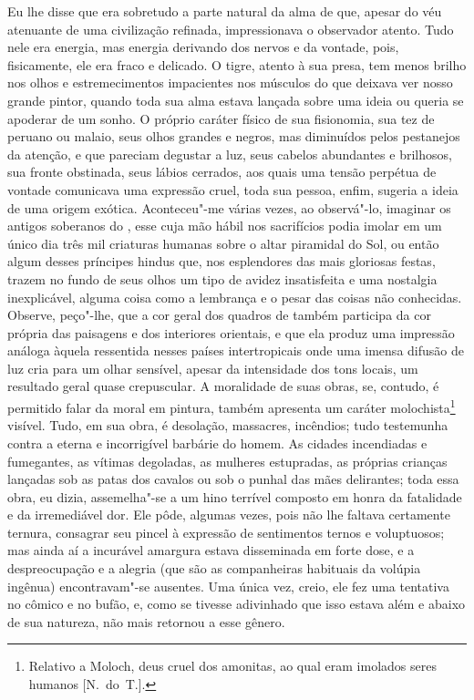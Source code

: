 Eu lhe disse que era sobretudo a parte natural da alma de  que,
apesar do véu atenuante de uma civilização refinada, impressionava o
observador atento. Tudo nele era energia, mas energia derivando dos
nervos e da vontade, pois, fisicamente, ele era fraco e delicado. O
tigre, atento à sua presa, tem menos brilho nos olhos e estremecimentos
impacientes nos músculos do que deixava ver nosso grande pintor, quando
toda sua alma estava lançada sobre uma ideia ou queria se apoderar de
um sonho. O próprio caráter físico de sua fisionomia, sua tez de
peruano ou malaio, seus olhos grandes e negros, mas diminuídos pelos
pestanejos da atenção, e que pareciam degustar a luz, seus cabelos
abundantes e brilhosos, sua fronte obstinada, seus lábios cerrados, aos
quais uma tensão perpétua de vontade comunicava uma expressão cruel,
toda sua pessoa, enfim, sugeria a ideia de uma origem exótica.
Aconteceu"-me várias vezes, ao observá"-lo, imaginar os antigos soberanos
do , esse  cuja mão hábil nos sacrifícios podia imolar
em um único dia três mil criaturas humanas sobre o altar piramidal do
Sol, ou então algum desses príncipes hindus que, nos esplendores das
mais gloriosas festas, trazem no fundo de seus olhos um tipo de avidez
insatisfeita e uma nostalgia inexplicável, alguma coisa como a
lembrança e o pesar das coisas não conhecidas. Observe, peço"-lhe, que a
cor geral dos quadros de  também participa da cor própria das
paisagens e dos interiores orientais, e que ela produz uma impressão
análoga àquela ressentida nesses países intertropicais onde uma imensa
difusão de luz cria para um olhar sensível, apesar da intensidade dos
tons locais, um resultado geral quase crepuscular. A moralidade de suas
obras, se, contudo, é permitido falar da moral em pintura, também
apresenta um caráter molochista\footnote{ Relativo a Moloch, deus 	
cruel dos amonitas, ao qual eram imolados seres humanos [N.~do~T.].}
visível. Tudo, em sua obra, é desolação, massacres, incêndios; tudo
testemunha contra a eterna e incorrigível barbárie do homem. As cidades
incendiadas e fumegantes, as vítimas degoladas, as mulheres estupradas,
as próprias crianças lançadas sob as patas dos cavalos ou sob o punhal
das mães delirantes; toda essa obra, eu dizia, assemelha"-se a um hino
terrível composto em honra da fatalidade e da irremediável dor. Ele
pôde, algumas vezes, pois não lhe faltava certamente ternura, consagrar
seu pincel à expressão de sentimentos ternos e voluptuosos; mas ainda
aí a incurável amargura estava disseminada em forte dose, e a
despreocupação e a alegria (que são as companheiras habituais da
volúpia ingênua) encontravam"-se ausentes. Uma única vez, creio, ele fez
uma tentativa no cômico e no bufão, e, como se tivesse adivinhado que
isso estava além e abaixo de sua natureza, não mais retornou a esse
gênero.

